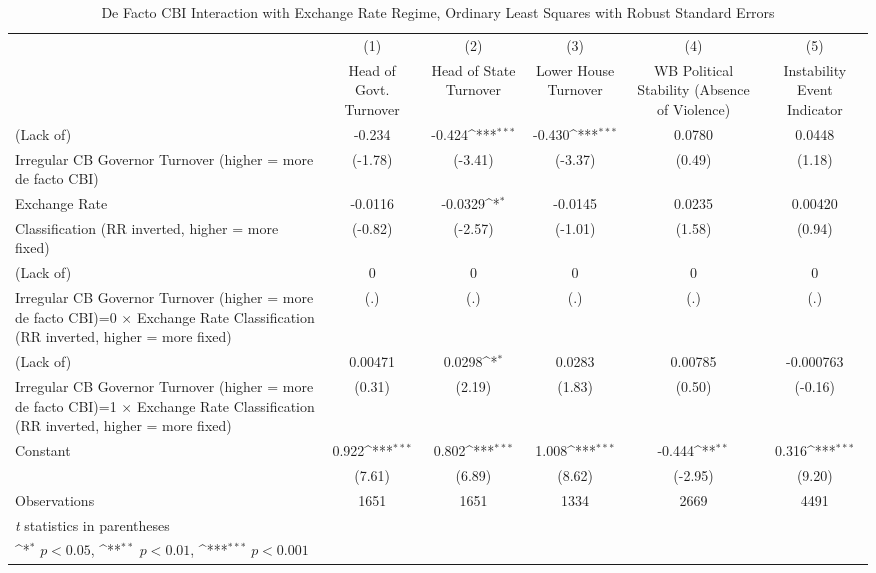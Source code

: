 \begin{table}[htbp]\centering
\def\sym#1{\ifmmode^{#1}\else\(^{#1}\)\fi}
\caption{De Facto CBI Interaction with Exchange Rate Regime, Ordinary Least Squares with Robust Standard Errors \label{imultIndOLSDF}}
\begin{tabular}{l*{5}{c}}
\toprule
                &\multicolumn{1}{c}{(1)}&\multicolumn{1}{c}{(2)}&\multicolumn{1}{c}{(3)}&\multicolumn{1}{c}{(4)}&\multicolumn{1}{c}{(5)}\\
                &\multicolumn{1}{c}{Head of Govt. Turnover}&\multicolumn{1}{c}{Head of State Turnover}&\multicolumn{1}{c}{Lower House Turnover}&\multicolumn{1}{c}{WB Political Stability (Absence of Violence)}&\multicolumn{1}{c}{Instability Event Indicator}\\
\midrule
(Lack of)       &   -0.234         &   -0.424\sym{***}&   -0.430\sym{***}&   0.0780         &   0.0448         \\
Irregular CB Governor Turnover (higher = more de facto CBI)&  (-1.78)         &  (-3.41)         &  (-3.37)         &   (0.49)         &   (1.18)         \\
\addlinespace
Exchange Rate   &  -0.0116         &  -0.0329\sym{*}  &  -0.0145         &   0.0235         &  0.00420         \\
Classification (RR inverted, higher = more fixed)&  (-0.82)         &  (-2.57)         &  (-1.01)         &   (1.58)         &   (0.94)         \\
\addlinespace
(Lack of)       &        0         &        0         &        0         &        0         &        0         \\
Irregular CB Governor Turnover (higher = more de facto CBI)=0 $\times$ Exchange Rate Classification (RR inverted, higher = more fixed)&      (.)         &      (.)         &      (.)         &      (.)         &      (.)         \\
\addlinespace
(Lack of)       &  0.00471         &   0.0298\sym{*}  &   0.0283         &  0.00785         &-0.000763         \\
Irregular CB Governor Turnover (higher = more de facto CBI)=1 $\times$ Exchange Rate Classification (RR inverted, higher = more fixed)&   (0.31)         &   (2.19)         &   (1.83)         &   (0.50)         &  (-0.16)         \\
\addlinespace
Constant        &    0.922\sym{***}&    0.802\sym{***}&    1.008\sym{***}&   -0.444\sym{**} &    0.316\sym{***}\\
                &   (7.61)         &   (6.89)         &   (8.62)         &  (-2.95)         &   (9.20)         \\
\midrule
Observations    &     1651         &     1651         &     1334         &     2669         &     4491         \\
\bottomrule
\multicolumn{6}{l}{\footnotesize \textit{t} statistics in parentheses}\\
\multicolumn{6}{l}{\footnotesize \sym{*} \(p<0.05\), \sym{**} \(p<0.01\), \sym{***} \(p<0.001\)}\\
\end{tabular}
\end{table}
